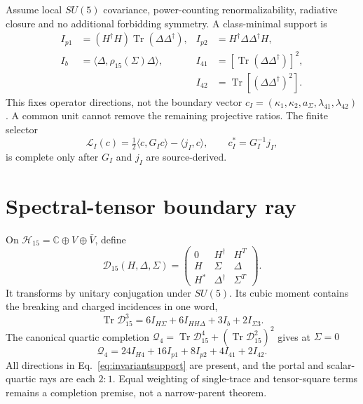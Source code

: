 Assume local $SU(5)$ covariance, power-counting renormalizability, radiative
closure and no additional forbidding symmetry. A class-minimal support is
\begin{equation}
\begin{aligned}
I_{p1}&=(H^\dagger H)\operatorname{Tr}(\Delta\Delta^\dagger),&
I_{p2}&=H^\dagger\Delta\Delta^\dagger H,\\
I_b&=\langle\Delta,\rho_{15}(\Sigma)\Delta\rangle,&
I_{41}&=[\operatorname{Tr}(\Delta\Delta^\dagger)]^2,\\
&&I_{42}&=\operatorname{Tr}[(\Delta\Delta^\dagger)^2].
\end{aligned}
\label{eq:invariantsupport}
\end{equation}
This fixes operator directions, not the boundary vector
$c_I=(\kappa_1,\kappa_2,a_\Sigma,\lambda_{41},\lambda_{42})$. A common unit
cannot remove the remaining projective ratios. The finite selector
\begin{equation}
\mathcal L_I(c)=\tfrac12\langle c,G_Ic\rangle-\langle j_I,c\rangle,
\qquad c_I^*=G_I^{-1}j_I,
\end{equation}
is complete only after $G_I$ and $j_I$ are source-derived.

\section{Spectral-tensor boundary ray}

On $\mathcal H_{15}=\mathbb C\oplus V\oplus\bar V$, define
\begin{equation}
\mathcal D_{15}(H,\Delta,\Sigma)=
\begin{pmatrix}
0&H^\dagger&H^T\\ H&\Sigma&\Delta\\
H^*&\Delta^\dagger&\Sigma^T
\end{pmatrix}.
\label{eq:spectraloperator}
\end{equation}
It transforms by unitary conjugation under $SU(5)$. Its cubic moment contains
the breaking and charged incidences in one word,
\begin{equation}
\operatorname{Tr}\mathcal D_{15}^3
=6I_{H\Sigma}+6I_{HH\Delta}+3I_b+2I_{\Sigma3}.
\end{equation}
The canonical quartic completion
$\mathcal Q_4=\operatorname{Tr}\mathcal D_{15}^4
+(\operatorname{Tr}\mathcal D_{15}^2)^2$ gives at $\Sigma=0$
\begin{equation}
\boxed{\mathcal Q_4=24I_{H4}+16I_{p1}+8I_{p2}+4I_{41}+2I_{42}.}
\label{eq:spectralray}
\end{equation}
All directions in Eq.~\eqref{eq:invariantsupport} are present, and the portal
and scalar-quartic rays are each $2{:}1$. Equal weighting of single-trace and
tensor-square terms remains a completion premise, not a narrow-parent theorem.

